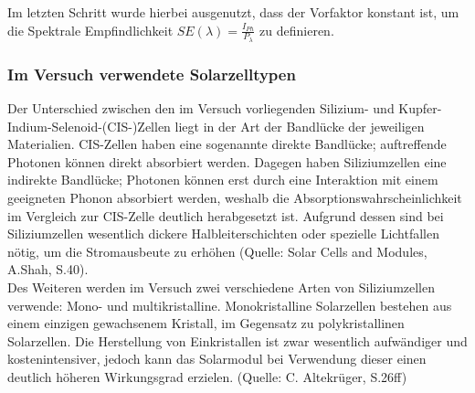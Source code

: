 Im letzten Schritt wurde hierbei ausgenutzt, dass der Vorfaktor konstant ist, um die Spektrale Empfindlichkeit $SE(\lambda) = \frac{I_{Ph}}{P_\lambda}$ zu definieren.

\subsubsection{Im Versuch verwendete Solarzelltypen}
Der Unterschied zwischen den im Versuch vorliegenden Silizium- und Kupfer-Indium-Selenoid-(CIS-)Zellen liegt in der Art der Bandlücke der jeweiligen Materialien. CIS-Zellen haben eine sogenannte direkte Bandlücke; auftreffende Photonen können direkt absorbiert werden. Dagegen haben Siliziumzellen eine indirekte Bandlücke; Photonen können erst durch eine Interaktion mit einem geeigneten Phonon absorbiert werden, weshalb die Absorptionswahrscheinlichkeit im Vergleich zur CIS-Zelle deutlich herabgesetzt ist. Aufgrund dessen sind bei Siliziumzellen wesentlich dickere Halbleiterschichten oder spezielle Lichtfallen nötig, um die Stromausbeute zu erhöhen (Quelle: Solar Cells and Modules, A.Shah, S.40). \\
Des Weiteren werden im Versuch zwei verschiedene Arten von Siliziumzellen verwende: Mono- und multikristalline. Monokristalline Solarzellen bestehen aus einem einzigen gewachsenem Kristall, im Gegensatz zu polykristallinen Solarzellen. Die Herstellung von Einkristallen ist zwar wesentlich aufwändiger und kostenintensiver, jedoch kann das Solarmodul bei Verwendung dieser einen deutlich höheren Wirkungsgrad erzielen. (Quelle: C. Altekrüger, S.26ff)
